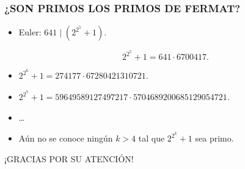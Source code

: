 \begin{frame}
  \frametitle{¿SON PRIMOS LOS PRIMOS DE FERMAT?}

  \begin{itemize}
  \item<2-> Euler: $641 \mid (2^{2^5} + 1)$.

    \[ 2^{2^5} + 1 = 641\cdot 6700417. \]

  \item<3-> $2^{2^6} + 1 = 274177\cdot 67280421310721$.

  \item<4-> $2^{2^7} + 1 = 59649589127497217\cdot 5704689200685129054721$.

  \item<5-> \dots

  \item<6-> Aún no se conoce ningún $k > 4$ tal que $2^{2^k} + 1$ sea primo.
  \end{itemize}
\end{frame}

\begin{frame}

  \vfill

  \begin{center}\huge\headingfont
    ¡GRACIAS POR SU ATENCIÓN!
  \end{center}

  \vfill
\end{frame}

